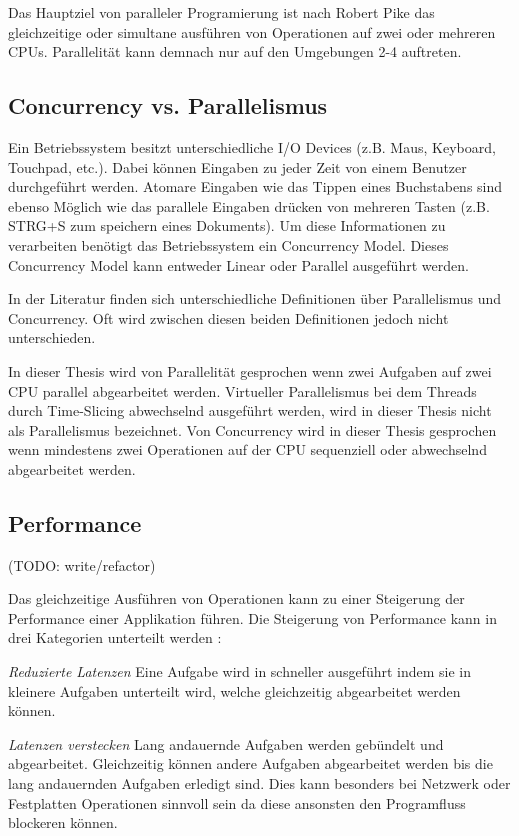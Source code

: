 Das Hauptziel von paralleler Programierung ist nach Robert Pike das gleichzeitige oder simultane ausführen von Operationen auf zwei oder mehreren CPUs.\cite[]{Pik2013} Parallelität kann demnach nur auf den Umgebungen 2-4 auftreten. 
 

\subsection{Concurrency vs. Parallelismus}

Ein Betriebssystem besitzt unterschiedliche I/O Devices (z.B. Maus, Keyboard, Touchpad, etc.). Dabei können Eingaben zu jeder Zeit von einem Benutzer durchgeführt werden. Atomare Eingaben wie das Tippen eines Buchstabens sind ebenso Möglich wie das parallele Eingaben drücken von mehreren Tasten (z.B. STRG+S zum speichern eines Dokuments). Um diese Informationen zu verarbeiten benötigt das Betriebssystem ein Concurrency Model. Dieses Concurrency Model kann entweder Linear oder Parallel ausgeführt werden. \cite[]{Pik2013}

In der Literatur finden sich unterschiedliche Definitionen über Parallelismus und Concurrency. Oft wird zwischen diesen beiden Definitionen jedoch nicht unterschieden.

In dieser Thesis wird von Parallelität gesprochen wenn zwei Aufgaben auf zwei CPU parallel abgearbeitet werden. Virtueller Parallelismus bei dem Threads durch Time-Slicing abwechselnd ausgeführt werden, wird in dieser Thesis nicht als Parallelismus bezeichnet. Von Concurrency wird in dieser Thesis gesprochen wenn mindestens zwei Operationen auf der CPU sequenziell oder abwechselnd abgearbeitet werden.



\subsection{Performance}
(TODO: write/refactor)

Das gleichzeitige Ausführen von Operationen kann zu einer Steigerung der Performance einer Applikation führen. Die Steigerung von Performance kann in drei Kategorien unterteilt werden \cite[p. 18]{Can08}:

\emph{Reduzierte Latenzen}
	Eine Aufgabe wird in schneller ausgeführt indem sie in kleinere Aufgaben unterteilt wird, welche gleichzeitig abgearbeitet werden können. \cite[p. 18]{Can08}

\emph{Latenzen verstecken}
	Lang andauernde Aufgaben werden gebündelt und abgearbeitet. Gleichzeitig können andere Aufgaben abgearbeitet werden bis die lang andauernden Aufgaben erledigt sind. Dies kann besonders bei Netzwerk oder Festplatten Operationen sinnvoll sein da diese ansonsten den Programfluss blockeren können.

